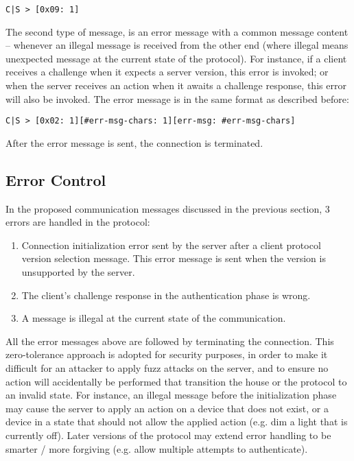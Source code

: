 \begin{verbatim}
C|S > [0x09: 1]
\end{verbatim}

\noindent
The second type of message, is an error message with a common message content -- whenever an illegal message is received from the other end (where illegal means unexpected message at the current state of the protocol). For instance, if a client receives a challenge when it expects a server version, this error is invoked; or when the server receives an action when it awaits a challenge response, this error will also be invoked. The error message is in the same format as described before:

\begin{verbatim}
C|S > [0x02: 1][#err-msg-chars: 1][err-msg: #err-msg-chars]
\end{verbatim}

\noindent
After the error message is sent, the connection is terminated.


\subsection{Error Control}
\label{sec:pdus:err}

In the proposed communication messages discussed in the previous section, 3 errors are handled in the protocol:
\begin{enumerate}
\item Connection initialization error sent by the server after a client protocol version selection message. This error message is sent when the version is unsupported by the server.
\item The client's challenge response in the authentication phase is wrong.
\item A message is illegal at the current state of the communication.
\end{enumerate}

All the error messages above are followed by terminating the connection. This zero-tolerance approach is adopted for security purposes, in order to make it difficult for an attacker to apply fuzz attacks on the server, and to ensure no action will accidentally be performed that transition the house or the protocol to an invalid state. For instance, an illegal message before the initialization phase may cause the server to apply an action on a device that does not exist, or a device in a state that should not allow the applied action (e.g. dim a light that is currently off).
Later versions of the protocol may extend error handling to be smarter / more forgiving (e.g. allow multiple attempts to authenticate).


